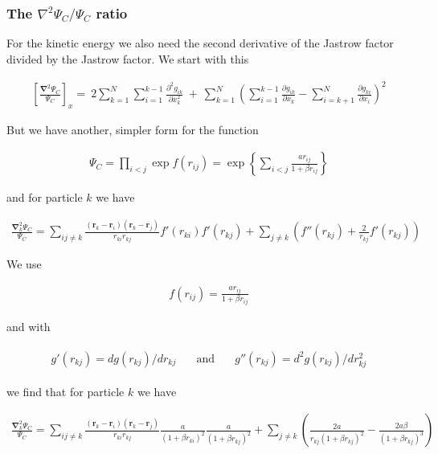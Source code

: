 \documentclass[11pt]{article}
\begin{document}
		\subsubsection{The $\nabla^{2} \Psi_{C}/\Psi_{C}$ ratio}
			For the kinetic energy we also need the second derivative of the Jastrow
			factor divided by the Jastrow factor. We start with this

			\begin{align}
				\left[\frac{\mathbf{\nabla}^{2}\Psi_{C}}{\Psi_{C}}\right]_{x}=\ 2\sum_{k=1}^{N}\sum_{i=1}^{k-1}\frac{\partial^{2}g_{ik}}{\partial x_{k}^{2}}\ +\ \sum_{k=1}^{N}\left(\sum_{i=1}^{k-1}\frac{\partial g_{ik}}{\partial x_{k}}-\sum_{i=k+1}^{N}\frac{\partial g_{ki}}{\partial x_{i}}\right)^{2}
			\end{align}

			But we have another, simpler form for the function

			\begin{align}
				\Psi_{C}=\prod_{i<j}\exp f(r_{ij})=\exp\left\{ \sum_{i<j}\frac{ar_{ij}}{1+\beta r_{ij}}\right\}
			\end{align}

			and for particle $k$ we have

			\begin{align}
				\frac{\mathbf{\nabla}_{k}^{2}\Psi_{C}}{\Psi_{C}}=\sum_{ij\ne k}\frac{(\mathbf{r}_{k}-\mathbf{r}_{i})(\mathbf{r}_{k}-\mathbf{r}_{j})}{r_{ki}r_{kj}}f'(r_{ki})f'(r_{kj})+\sum_{j\ne k}\left(f''(r_{kj})+\frac{2}{r_{kj}}f'(r_{kj})\right)
			\end{align}

			We use

			\begin{align}
				f(r_{ij})=\frac{ar_{ij}}{1+\beta r_{ij}}
			\end{align}

			and with

			\begin{align}
				\begin{array}{ccc}
				g'(r_{kj})=dg(r_{kj})/dr_{kj} & \quad\mbox{and}\quad & g''(r_{kj})=d^{2}g(r_{kj})/dr_{kj}^{2}\end{array}
			\end{align}

			we find that for particle $k$ we have

			\begin{align}
				\frac{\mathbf{\nabla}_{k}^{2}\Psi_{C}}{\Psi_{C}}=\sum_{ij\ne k}\frac{(\mathbf{r}_{k}-\mathbf{r}_{i})(\mathbf{r}_{k}-\mathbf{r}_{j})}{r_{ki}r_{kj}}\frac{a}{(1+\beta r_{ki})^{2}}\frac{a}{(1+\beta r_{kj})^{2}}+\sum_{j\ne k}\left(\frac{2a}{r_{kj}(1+\beta r_{kj})^{2}}-\frac{2a\beta}{(1+\beta r_{kj})^{3}}\right)
			\end{align}
\end{document}
